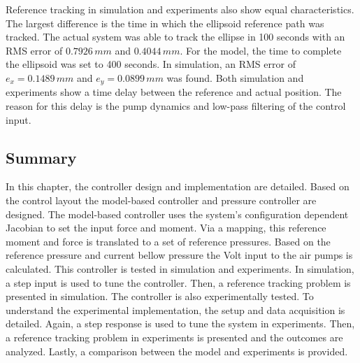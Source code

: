Reference tracking in simulation and experiments also show equal characteristics. The largest difference is the time in which the ellipsoid reference path was tracked. The actual system was able to track the ellipse in 100 seconds with an RMS error of $0.7926 \hspace{2pt} mm$ and $0.4044 \hspace{2pt} mm$. For the model, the time to complete the ellipsoid was set to 400 seconds. In simulation, an RMS error of $e_x = 0.1489  \hspace{2pt} mm$ and $e_y = 0.0899 \hspace{2pt} mm$ was found. Both simulation and experiments show a time delay between the reference and actual position. The reason for this delay is the pump dynamics and low-pass filtering of the control input.



\subsection*{Summary}


In this chapter, the controller design and implementation are detailed. Based on the control layout the model-based controller and pressure controller are designed. The model-based controller uses the system's configuration dependent Jacobian to set the input force and moment. Via a mapping, this reference moment and force is translated to a set of reference pressures. Based on the reference pressure and current bellow pressure the Volt input to the air pumps is calculated. This controller is tested in simulation and experiments. In simulation, a step input is used to tune the controller. Then, a reference tracking problem is presented in simulation. The controller is also experimentally tested. To understand the experimental implementation, the setup and data acquisition is detailed. Again, a step response is used to tune the system in experiments. Then, a reference tracking problem in experiments is presented and the outcomes are analyzed. Lastly, a comparison between the model and experiments is provided. 



























